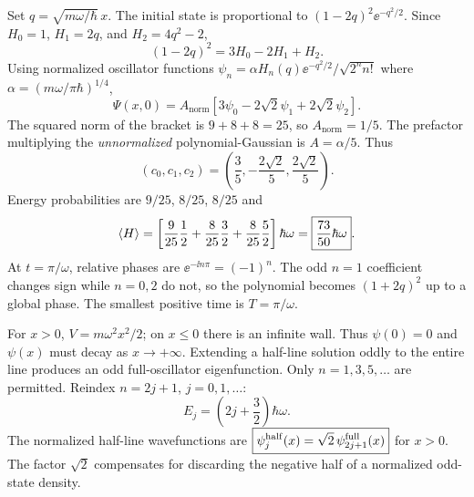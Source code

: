Set $q=\sqrt{m\omega/\hbar}\,x$.
The initial state is proportional to
$(1-2q)^2\ee^{-q^2/2}$.
Since $H_0=1$, $H_1=2q$, and
$H_2=4q^2-2$,
\begin{equation}
(1-2q)^2=3H_0-2H_1+H_2.
\end{equation}
Using normalized oscillator functions
$\psi_n=\alpha H_n(q)\ee^{-q^2/2}/\sqrt{2^nn!}$
where $\alpha=(m\omega/\pi\hbar)^{1/4}$,
\begin{equation}
\Psi(x,0)=A_{\mathrm{norm}}
\left[3\psi_0-2\sqrt2\psi_1+2\sqrt2\psi_2\right].
\end{equation}
The squared norm of the bracket is
$9+8+8=25$, so $A_{\mathrm{norm}}=1/5$.
The prefactor multiplying the \emph{unnormalized}
polynomial-Gaussian is $A=\alpha/5$.
Thus
\begin{equation}
\boxed{(c_0,c_1,c_2)=
\left(\frac35,-\frac{2\sqrt2}5,
\frac{2\sqrt2}5\right)}.
\end{equation}
Energy probabilities are $9/25$, $8/25$, $8/25$ and
\begin{equation}
\left\langle H\right\rangle=
\left[\frac9{25}\frac12+\frac8{25}\frac32+
\frac8{25}\frac52\right]\hbar\omega
=\boxed{\frac{73}{50}\hbar\omega}.
\end{equation}
At $t=\pi/\omega$, relative phases are
$\ee^{-\ii n\pi}=(-1)^n$.
The odd $n=1$ coefficient changes sign while
$n=0,2$ do not, so the polynomial becomes
$(1+2q)^2$ up to a global phase.
The smallest positive time is
$\boxed{T=\pi/\omega}$.

For $x>0$, $V=m\omega^2x^2/2$; on $x\le0$
there is an infinite wall. Thus
$\psi(0)=0$ and $\psi(x)$ must decay as
$x\to+\infty$. Extending a half-line solution
oddly to the entire line produces an
odd full-oscillator eigenfunction.
Only $n=1,3,5,\dots$ are permitted.
Reindex $n=2j+1$, $j=0,1,\dots$:
\begin{equation}
\boxed{E_j=\left(2j+\frac32\right)\hbar\omega}.
\end{equation}
The normalized half-line wavefunctions are
$\boxed{\psi_j^{\rm half}(x)=\sqrt2\,
\psi_{2j+1}^{\rm full}(x)}$ for $x>0$.
The factor $\sqrt2$ compensates for
discarding the negative half of a normalized
odd-state density.

